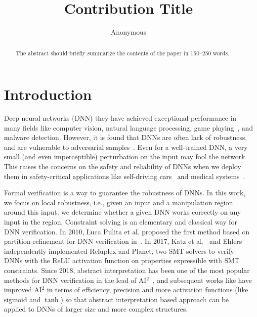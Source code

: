 \documentclass[runningheads]{llncs}
\begin{document}
%
\title{Contribution Title}
%
%
\author{Anonymous}
%
%
%
\maketitle              %
%
\begin{abstract}
The abstract should briefly summarize the contents of the paper in
150--250 words.

\end{abstract}
%
%
%


\section{Introduction}
Deep  neural networks (DNN) they have achieved exceptional performance in many fields like computer vision, natural language processing, game playing~\cite{alphago}, and malware detection.
However, it is found that DNNs are often lack of robustness, and are vulnerable to adversarial samples~\cite{SZSBEGF2014}. 
Even for a well-trained DNN, a very small (and even imperceptible) perturbation on the input may fool the network. 
This raises the concerns on the safety and reliability of DNNs when we deploy them in safety-critical applications like self-driving cars~\cite{selfdriving} and medical systems~\cite{medicalsystem}. 

Formal verification is a way to guarantee the robustness of DNNs.
In this work, we focus on local robustness, i.e., given an input and a manipulation region around this input, we determine whether a given DNN works correctly on any input in the region. 
Constraint solving is an elementary and classical way for DNN verification.
In 2010, Luca Pulita et al. proposed the first method based on partition-refinement for DNN verification in~\cite{DBLP:conf/cav/PulinaT10}. 
In 2017, Katz et al.~\cite{reluplex} and Ehlers~\cite{planet} independently implemented Reluplex and Planet, two SMT solvers to verify DNNs with the $\mathrm{ReLU}$ activation function on properties expressible with SMT constraints. 
Since 2018, abstract interpretation has been one of the most popular methods for DNN verification in the lead of AI${}^2$~\cite{AI2}, and subsequent works like \cite{deepz,deeppoly,deepsymbol,charon,krelu,deeppolygpu,prodeep} have improved AI${}^2$ in terms of efficiency, precision and more activation functions (like sigmoid and $\tanh$) so that abstract interpretation based approach can be applied to DNNs of larger size and more complex structures. 
\end{document}
